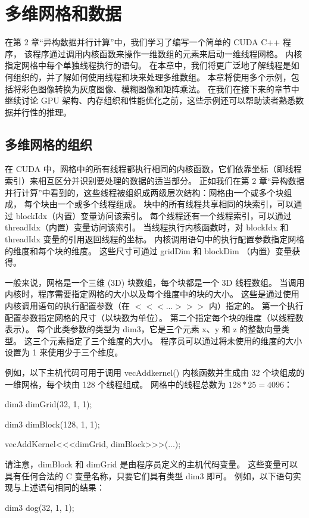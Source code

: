 \section{多维网格和数据}
在第 2 章“异构数据并行计算”中，我们学习了编写一个简单的 CUDA C++ 程序，
该程序通过调用内核函数来操作一维数组的元素来启动一维线程网格。 内核指定网格中每个单独线程执行的语句。 
在本章中，我们将更广泛地了解线程是如何组织的，并了解如何使用线程和块来处理多维数组。 
本章将使用多个示例，包括将彩色图像转换为灰度图像、模糊图像和矩阵乘法。 
在我们在接下来的章节中继续讨论 GPU 架构、内存组织和性能优化之前，这些示例还可以帮助读者熟悉数据并行性的推理。

\subsection{多维网格的组织}
在 CUDA 中，网格中的所有线程都执行相同的内核函数，它们依靠坐标（即线程索引）来相互区分并识别要处理的数据的适当部分。 
正如我们在第 2 章“异构数据并行计算”中看到的，这些线程被组织成两级层次结构：网格由一个或多个块组成，
每个块由一个或多个线程组成。 块中的所有线程共享相同的块索引，可以通过 blockIdx（内置）变量访问该索引。 
每个线程还有一个线程索引，可以通过 threadIdx（内置）变量访问该索引。 
当线程执行内核函数时，对 blockIdx 和 threadIdx 变量的引用返回线程的坐标。 
内核调用语句中的执行配置参数指定网格的维度和每个块的维度。 这些尺寸可通过 gridDim 和 blockDim （内置）变量获得。

一般来说，网格是一个三维 (3D) 块数组，每个块都是一个 3D 线程数组。 
当调用内核时，程序需要指定网格的大小以及每个维度中的块的大小。 
这些是通过使用内核调用语句的执行配置参数（在 $<<<...>>>$ 内）指定的。 
第一个执行配置参数指定网格的尺寸（以块数为单位）。 第二个指定每个块的维度（以线程数表示）。 
每个此类参数的类型为 dim3，它是三个元素 x、y 和 z 的整数向量类型。 
这三个元素指定了三个维度的大小。 程序员可以通过将未使用的维度的大小设置为 1 来使用少于三个维度。

例如，以下主机代码可用于调用 vecAddkernel() 内核函数并生成由 32 个块组成的一维网格，每个块由 128 个线程组成。 
网格中的线程总数为 $128 * 25 = 4096$：

dim3 dimGrid(32, 1, 1);

dim3 dimBlock(128, 1, 1);

vecAddKernel<<<dimGrid, dimBlock>>>(...);

请注意，dimBlock 和 dimGrid 是由程序员定义的主机代码变量。 
这些变量可以具有任何合法的 C 变量名称，只要它们具有类型 dim3 即可。 例如，以下语句实现与上述语句相同的结果：

dim3 dog(32, 1, 1);

